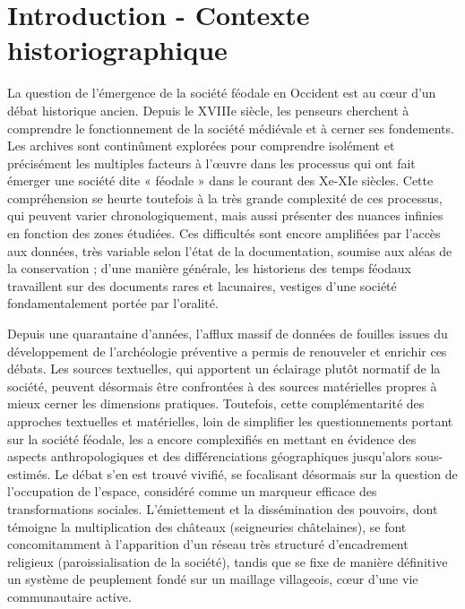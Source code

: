 \clearpage

\section*{Introduction - Contexte historiographique}
\label{sec:chap2-intro}

{\redroman
	La question de l'émergence de la société féodale en Occident est au cœur d'un débat historique ancien.
	Depuis le XVIIIe siècle, les penseurs cherchent à comprendre le fonctionnement de la société médiévale et à cerner ses fondements.
	Les archives sont continûment explorées pour comprendre isolément et précisément les multiples facteurs à l'œuvre dans les processus qui ont fait émerger une société dite « féodale » dans le courant des Xe-XIe siècles.
	Cette compréhension se heurte toutefois à la très grande complexité de ces processus, qui peuvent varier chronologiquement, mais aussi présenter des nuances infinies en fonction des zones étudiées.
	Ces difficultés sont encore amplifiées par l'accès aux données, très variable selon l'état de la documentation, soumise aux aléas de la conservation ; d'une manière générale, les historiens des temps féodaux travaillent sur des documents rares et lacunaires, vestiges d'une société fondamentalement portée par l'oralité.
	
	Depuis une quarantaine d'années, l'afflux massif de données de fouilles issues du développement de l'archéologie préventive a permis de renouveler et enrichir ces débats.
	Les sources textuelles, qui apportent un éclairage plutôt normatif de la société, peuvent désormais être confrontées à des sources matérielles propres à mieux cerner les dimensions pratiques.
	Toutefois, cette complémentarité des approches textuelles et matérielles, loin de simplifier les questionnements portant sur la société féodale, les a encore complexifiés en mettant en évidence des aspects anthropologiques et des différenciations géographiques jusqu'alors sous-estimés.
	Le débat s'en est trouvé vivifié, se focalisant désormais sur la question de l'occupation de l'espace, considéré comme un marqueur efficace des transformations sociales.
	L'émiettement et la dissémination des pouvoirs, dont témoigne la multiplication des châteaux (seigneuries châtelaines), se font concomitamment à l'apparition d'un réseau très structuré d'encadrement religieux (paroissialisation de la société), tandis que se fixe de manière définitive un système de peuplement fondé sur un maillage villageois, cœur d'une vie communautaire active.
	
}
